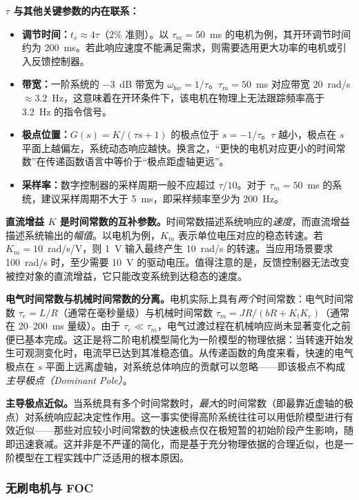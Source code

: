 \begin{mdframed}[linewidth=1pt, innertopmargin=10pt, innerbottommargin=10pt]
\textbf{$\tau$ 与其他关键参数的内在联系：}
\begin{itemize}[nosep]
    \item \textbf{调节时间：}$t_s \approx 4\tau$（2\% 准则）。以 $\tau_m = 50$~ms 的电机为例，其开环调节时间约为 200~ms。若此响应速度不能满足需求，则需要选用更大功率的电机或引入反馈控制器。
    \item \textbf{带宽：}一阶系统的 $-3$~dB 带宽为 $\omega_{bw} = 1/\tau$。$\tau_m = 50$~ms 对应带宽 $20$~rad/s $\approx 3.2$~Hz，这意味着在开环条件下，该电机在物理上无法跟踪频率高于 3.2~Hz 的指令信号。
    \item \textbf{极点位置：}$G(s) = K/(\tau s + 1)$ 的极点位于 $s = -1/\tau$。$\tau$ 越小，极点在 $s$ 平面上越偏左，系统动态响应越快。换言之，``更快的电机对应更小的时间常数''在传递函数语言中等价于``极点距虚轴更远''。
    \item \textbf{采样率：}数字控制器的采样周期一般不应超过 $\tau/10$。对于 $\tau_m = 50$~ms 的系统，建议采样周期不大于 5~ms，即采样频率至少为 200~Hz。
\end{itemize}

\textbf{直流增益 $K$ 是时间常数的互补参数。}时间常数描述系统响应的\textit{速度}，而直流增益描述系统输出的\textit{幅值}。以电机为例，$K_m$ 表示单位电压对应的稳态转速。若 $K_m = 10$~rad/s/V，则 1~V 输入最终产生 10~rad/s 的转速。当应用场景要求 100~rad/s 时，至少需要 10~V 的驱动电压。值得注意的是，反馈控制器无法改变被控对象的直流增益，它只能改变系统到达稳态的速度。

\textbf{电气时间常数与机械时间常数的分离。}电机实际上具有\textit{两个}时间常数：电气时间常数 $\tau_e = L/R$（通常在毫秒量级）与机械时间常数 $\tau_m = JR/(bR + K_tK_e)$（通常在 20--200~ms 量级）。由于 $\tau_e \ll \tau_m$，电气过渡过程在机械响应尚未显著变化之前便已基本完成。这正是将二阶电机模型简化为一阶模型的物理依据：当转速开始发生可观测变化时，电流早已达到其准稳态值。从传递函数的角度来看，快速的电气极点在 $s$ 平面上远离虚轴，对系统总体响应的贡献可以忽略——即该极点不构成\textit{主导极点（Dominant Pole）}。

\textbf{主导极点近似。}当系统具有多个时间常数时，\textit{最大}的时间常数（即最靠近虚轴的极点）对系统响应起决定性作用。这一事实使得高阶系统往往可以用低阶模型进行有效近似——那些对应较小时间常数的快速极点仅在极短暂的初始阶段产生影响，随即迅速衰减。这并非是不严谨的简化，而是基于充分物理依据的合理近似，也是一阶模型在工程实践中广泛适用的根本原因。
\end{mdframed}

\subsubsection*{无刷电机与 FOC}

